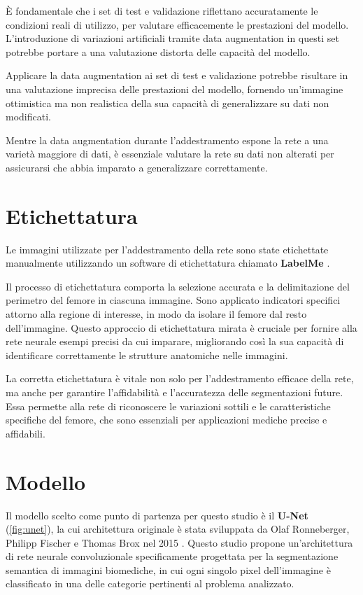 È fondamentale che i set di test e validazione riflettano accuratamente le condizioni reali di
utilizzo, per valutare efficacemente le prestazioni del modello. L'introduzione di variazioni
artificiali tramite data augmentation in questi set potrebbe portare a una valutazione distorta
delle capacità del modello.

Applicare la data augmentation ai set di test e validazione potrebbe risultare in una valutazione
imprecisa delle prestazioni del modello, fornendo un'immagine ottimistica ma non realistica della
sua capacità di generalizzare su dati non modificati.

Mentre la data augmentation durante l'addestramento espone la rete a una varietà maggiore di dati, è
essenziale valutare la rete su dati non alterati per assicurarsi che abbia imparato a generalizzare
correttamente.



\section{Etichettatura}
Le immagini utilizzate per l'addestramento della rete sono state etichettate manualmente utilizzando
un software di etichettatura chiamato \textbf{LabelMe} \cite{labelme}.

Il processo di etichettatura comporta la selezione accurata e la delimitazione del perimetro del
femore in ciascuna immagine. Sono applicato indicatori specifici attorno alla regione di interesse,
in modo da isolare il femore dal resto dell'immagine. Questo approccio di etichettatura mirata è
cruciale per fornire alla rete neurale esempi precisi da cui imparare, migliorando così la sua
capacità di identificare correttamente le strutture anatomiche nelle immagini.

La corretta etichettatura è vitale non solo per l'addestramento efficace della rete, ma anche per
garantire l'affidabilità e l'accuratezza delle segmentazioni future. Essa permette alla rete di
riconoscere le variazioni sottili e le caratteristiche specifiche del femore, che sono essenziali
per applicazioni mediche precise e affidabili.




\section{Modello}

Il modello scelto come punto di partenza per questo studio è il \textbf{U-Net} (\autoref{fig:unet}),
la cui architettura originale è stata sviluppata da Olaf Ronneberger, Philipp Fischer e Thomas Brox
nel 2015 \cite{ronneberger2015unet}. Questo studio propone un'architettura di rete neurale
convoluzionale specificamente progettata per la segmentazione semantica di immagini biomediche, in
cui ogni singolo pixel dell'immagine è classificato in una delle categorie pertinenti al problema
analizzato.

